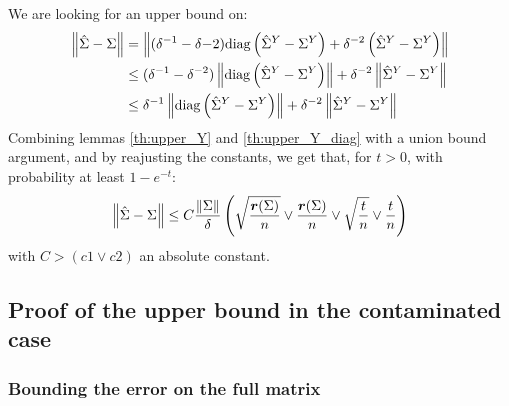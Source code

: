 \documentclass{article}
\numberwithin{equation}{section}
\numberwithin{equation}{section}
\begin{document}
        We are looking for an upper bound on:
        \begin{equation}
        \begin{split}
            \left\Vert \hat{\Sigma} - \Sigma \right\Vert & = \left\Vert (\delta^{-1}-\delta{-2})\text{diag} \left(\hat{\Sigma}^Y - \Sigma^Y\right) + \delta^{-2}\left(\hat{\Sigma}^Y - \Sigma^Y\right) \right\Vert\\
            & \leq (\delta^{-1}-\delta^{-2}) \left\Vert \text{diag} \left(\hat{\Sigma}^Y - \Sigma^Y\right) \right\Vert + \delta^{-2} \left\Vert \hat{\Sigma}^Y - \Sigma^Y \right\Vert\\
            & \leq \delta^{-1} \left\Vert \text{diag} \left(\hat{\Sigma}^Y - \Sigma^Y\right) \right\Vert+ \delta^{-2} \left\Vert \hat{\Sigma}^Y - \Sigma^Y \right\Vert
        \end{split}
        \end{equation}
        Combining lemmas \ref{th:upper_Y} and \ref{th:upper_Y_diag} with a union bound argument, and by reajusting the constants, we get that, for $t>0$, with probability at least $1-e^{-t}$:
        \begin{equation}
            \left\Vert \hat{\Sigma} - \Sigma \right\Vert \leq C \frac{\left\Vert \Sigma \right\Vert}{\delta} \left( \sqrt{\frac{\bm{r}(\Sigma)}{n}} \lor \frac{\bm{r}(\Sigma)}{n} \lor \sqrt{\frac{t}{n}} \lor \frac{t}{n}\right)
        \end{equation}
        with $C > (c1 \lor c2)$ an absolute constant.
        
    \subsection{Proof of the upper bound in the contaminated case}
        
    \subsubsection{Bounding the error on the full matrix}
        
\end{document}

